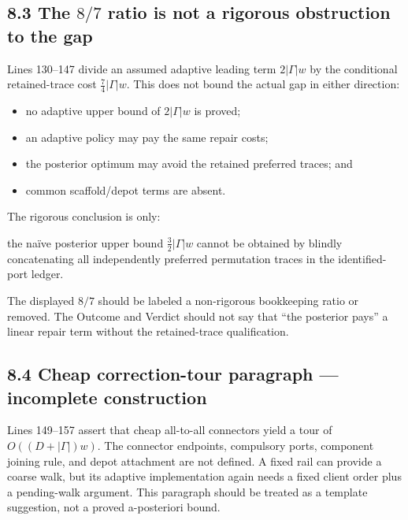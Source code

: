 \documentclass[11pt,a4paper]{article}
\begin{document}
\subsection*{8.3 The \(8/7\) ratio is not a rigorous obstruction to the gap}

Lines 130–147 divide an assumed adaptive leading term \(2|\Gamma|w\) by the conditional retained-trace cost \(\tfrac74|\Gamma|w\).  This does not bound the actual gap in either direction:


\begin{itemize}

\item no adaptive upper bound of \(2|\Gamma|w\) is proved;

\item an adaptive policy may pay the same repair costs;

\item the posterior optimum may avoid the retained preferred traces; and

\item common scaffold/depot terms are absent.

\end{itemize}

The rigorous conclusion is only:


\begin{ResearchQuote}

the naïve posterior upper bound \(\tfrac32|\Gamma|w\) cannot be obtained by blindly concatenating all independently preferred permutation traces in the identified-port ledger.

\end{ResearchQuote}

The displayed \(8/7\) should be labeled a non-rigorous bookkeeping ratio or removed.  The Outcome and Verdict should not say that “the posterior pays” a linear repair term without the retained-trace qualification.


\subsection*{8.4 Cheap correction-tour paragraph — incomplete construction}

Lines 149–157 assert that cheap all-to-all connectors yield a tour of \(O((D+|\Gamma|)w)\).  The connector endpoints, compulsory ports, component joining rule, and depot attachment are not defined.  A fixed rail can provide a coarse walk, but its adaptive implementation again needs a fixed client order plus a pending-walk argument.  This paragraph should be treated as a template suggestion, not a proved a-posteriori bound.
\end{document}
